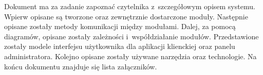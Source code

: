\documentclass[../praca-dyplomowa.tex]{subfiles}
\begin{document}

\abstract
Dokument ma za zadanie zapoznać czytelnika z~szczegółowym opisem systemu.
Wpierw opisane są tworzone oraz zewnętrznie dostarczone moduły.
Następnie opisane zostały metody komunikacji między modułami.
Dalej, za pomocą diagramów, opisane zostały zależności i~współdziałanie modułów.
Przedstawione zostały modele interfejsu użytkownika dla aplikacji klienckiej oraz panelu administratora.
Kolejno opisane zostały używane narzędzia oraz technologie.
Na końcu dokumentu znajduje się lista załączników.

\begin{Revisions}
\end{Revisions}

\tableofcontents
\end{document}
